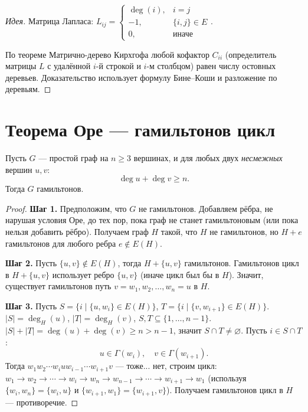 \documentclass[12pt]{article}
\begin{document}
\begin{proof}[Идея]
Матрица Лапласа: $L_{ij} = \begin{cases} \deg(i), & i=j \\ -1, & \{i,j\}\in E \\ 0, & \text{иначе} \end{cases}$.

По теореме Матрично-дерево Кирхгофа любой кофактор $C_{ii}$
(определитель матрицы $L$ с удалённой $i$-й строкой и $i$-м столбцом)
равен числу остовных деревьев. Доказательство использует формулу
Бине--Коши и разложение по деревьям.
\end{proof}

\section{Теорема Оре --- гамильтонов цикл}

\begin{theorem}[Оре, 1960]
Пусть $G$ --- простой граф на $n \geq 3$ вершинах, и для любых двух
\emph{несмежных} вершин $u, v$:
\[
\deg u + \deg v \geq n.
\]
Тогда $G$ гамильтонов.
\end{theorem}

\begin{proof}
\textbf{Шаг 1.} Предположим, что $G$ не гамильтонов.
Добавляем рёбра, не нарушая условия Оре, до тех пор, пока
граф не станет гамильтоновым (или пока нельзя добавить рёбро).
Получаем граф $H$ такой, что $H$ не гамильтонов, но $H + e$
гамильтонов для любого ребра $e \notin E(H)$.

\textbf{Шаг 2.} Пусть $\{u,v\} \notin E(H)$, тогда $H+\{u,v\}$
гамильтонов. Гамильтонов цикл в $H+\{u,v\}$ использует ребро
$\{u,v\}$ (иначе цикл был бы в $H$). Значит, существует
гамильтонов путь $v = w_1, w_2, \ldots, w_n = u$ в $H$.

\textbf{Шаг 3.} Пусть $S = \{i \mid \{u, w_i\} \in E(H)\}$,
$T = \{i \mid \{v, w_{i+1}\} \in E(H)\}$.
$|S| = \deg_H(u)$, $|T| = \deg_H(v)$, $S, T \subseteq \{1,\ldots,n-1\}$.
$|S| + |T| = \deg(u)+\deg(v) \geq n > n-1$, значит
$S \cap T \neq \varnothing$. Пусть $i \in S \cap T$:
\[
u \in \Gamma(w_i), \quad v \in \Gamma(w_{i+1}).
\]
Тогда $w_1 w_2 \cdots w_i u w_{i-1} \cdots w_{i+1} v$ ---
тоже... нет, строим цикл:
$w_1 \to w_2 \to \cdots \to w_i \to w_n \to w_{n-1} \to \cdots \to w_{i+1} \to w_1$
(используя $\{w_i, w_n\}=\{w_i,u\}$ и $\{w_{i+1},w_1\}=\{w_{i+1},v\}$).
Получаем гамильтонов цикл в $H$ --- противоречие.
\end{proof}
\end{document}
